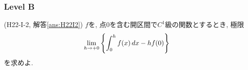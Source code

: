 \subsubsection{Level B}

\begin{prob} (H22-I-2, 解答\ref{ans:H22I2}) \label{prob:H22I2}
$f$を, 点0を含む開区間で$C^{1}$級の関数とするとき, 極限
\[\displaystyle\lim_{h\to +0} \left\{ \displaystyle\int_{0}^{h} f(x)\, dx - hf(0) \right\}\]
を求めよ.
\end{prob}
\begin{hint}
\end{hint}
